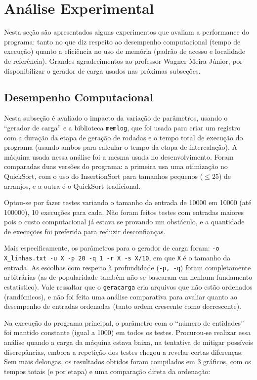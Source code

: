 \documentclass{article}
\def\code#1{\texttt{#1}}
\begin{document}
\section{Análise Experimental}

Nesta seção são apresentados alguns experimentos que avaliam a performance do programa: tanto no que diz respeito ao desempenho computacional (tempo de execução) quanto a eficiência no uso de memória (padrão de acesso e localidade de referência). Grandes agradecimentos ao professor Wagner Meira Júnior, por disponibilizar o gerador de carga usados nas próximas subseções.

\subsection{Desempenho Computacional}

Nesta subseção é avaliado o impacto da variação de parâmetros, usando o ``gerador de carga'' e a biblioteca \code{memlog}, que foi usada para criar um registro com a duração da etapa de geração de rodadas e o tempo total de execução do programa (usando ambos para calcular o tempo da etapa de intercalação). A máquina usada nessa análise foi a mesma usada no desenvolvimento. Foram comparadas duas versões do programa: a primeira usa uma otimização no QuickSort, com o uso do InsertionSort para tamanhos pequenos (\( \leq 25 \)) de arranjos, e a outra é o QuickSort tradicional.

Optou-se por fazer testes variando o tamanho da entrada de 10000 em 10000 (até 100000), 10 execuções para cada. Não foram feitos testes com entradas maiores pois o custo computacional já estava se provando um obstáculo, e a quantidade de execuções foi preferida para reduzir desconfianças.

Mais especificamente, os parâmetros para o gerador de carga foram: \code{-o X\_linhas.txt -u X -p 20 -q 1 -r X -s X/10}, em que \code{X} é o tamanho da entrada. As escolhas com respeito à profundidade (\code{-p, -q}) foram completamente arbitrárias (as de popularidade também não se basearam em nenhum fundamento estatístico). Vale ressaltar que o \code{geracarga} cria arquivos que não estão ordenados (randômicos), e não foi feita uma análise comparativa para avaliar quanto ao desempenho de entradas ordenadas (tanto ordem crescente como decrescente).

Na execução do programa principal, o parâmetro com o ``número de entidades'' foi mantido constante (igual a 1000) em todos os testes. Procurou-se realizar essa análise quando a carga da máquina estava baixa, na tentativa de mitigar possíveis discrepâncias, embora a repetição dos testes chegou a revelar certas diferenças. Sem mais delongas, os resultados obtidos foram compilados em 3 gráficos, com os tempos totais (e por etapa) e uma comparação direta da ordenação:
\end{document}

